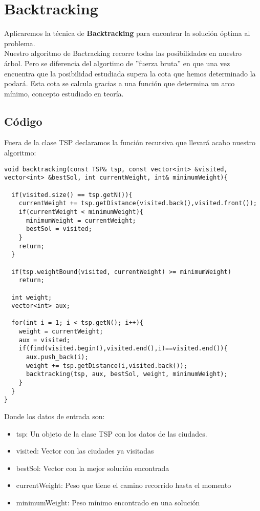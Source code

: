 \documentclass[a4]{article}
\begin{document}
\section{Backtracking}
Aplicaremos la técnica de \textbf{Backtracking} para encontrar la
solución óptima al problema. \\
Nuestro algoritmo de Bactracking recorre todas las posibilidades en nuestro árbol. Pero se diferencia del algortimo de ''fuerza bruta'' en que una vez encuentra que la posibilidad estudiada supera la cota que hemos determinado la podará. Esta cota se calcula gracias a una función que determina un arco mínimo, concepto estudiado en teoría.

\subsection{Código}
Fuera de la clase TSP declaramos la función recursiva que llevará acabo nuestro algoritmo:
\begin{lstlisting}
void backtracking(const TSP& tsp, const vector<int> &visited, vector<int> &bestSol, int currentWeight, int& minimumWeight){

  if(visited.size() == tsp.getN()){
    currentWeight += tsp.getDistance(visited.back(),visited.front());
    if(currentWeight < minimumWeight){
      minimumWeight = currentWeight;
      bestSol = visited;
    }
    return;
  }

  if(tsp.weightBound(visited, currentWeight) >= minimumWeight)
    return;

  int weight;
  vector<int> aux;

  for(int i = 1; i < tsp.getN(); i++){
    weight = currentWeight;
    aux = visited;
    if(find(visited.begin(),visited.end(),i)==visited.end()){
      aux.push_back(i);
      weight += tsp.getDistance(i,visited.back());
      backtracking(tsp, aux, bestSol, weight, minimumWeight);
    }
  }
}
\end{lstlisting}

Donde los datos de entrada son:
\begin{itemize}
\item tsp: Un objeto de la clase TSP con los datos de las ciudades.
\item visited: Vector con las ciudades ya visitadas
\item bestSol: Vector con la mejor solución encontrada
\item currentWeight: Peso que tiene el camino recorrido hasta el momento
\item minimumWeight: Peso mínimo encontrado en una solución
\end{itemize}
\end{document}
